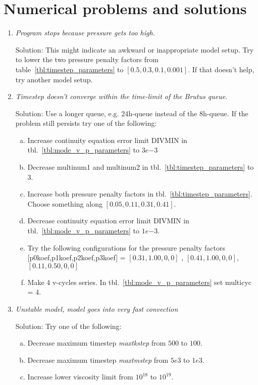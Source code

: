 
\section{Numerical problems and solutions}

\begin{enumerate}[-]
\item \textit{Program stops because pressure gets too high.}

Solution: This might indicate an awkward or inappropriate model setup. Try to lower the two pressure penalty factors from table~\ref{tbl:timestep_parameters} to $[0.5,0.3,0.1,0.001]$. If that doesn't help, try another model setup.
\item \textit{Timestep doesn't converge within the time-limit of the Brutus queue.}

Solution: Use a longer queue, e.g. 24h-queue instead of the 8h-queue. If the problem still persists try one of the following:
\begin{enumerate}[a)]
\item Increase continuity equation error limit DIVMIN in tbl.~\ref{tbl:mode_v_p_parameters} to $3e{-3}$
\item Decrease multinum1 and multinum2 in tbl.~\ref{tbl:timestep_parameters} to $3$.
\item Increase both pressure penalty factors in tbl.~\ref{tbl:timestep_parameters}. Choose something along $[0.05,0.11,0.31,0.41]$.
\item Decrease continuity equation error limit DIVMIN in tbl.~\ref{tbl:mode_v_p_parameters} to $1e{-3}$.
\item Try the following configurations for the pressure penalty factors [p0koef,p1koef,p2koef,p3koef] = $[0.31,1.00,0,0]$ , $[0.41,1.00,0,0]$, $[0.11,0.50,0,0]$
\item Make 4 v-cycles series. In tbl.~\ref{tbl:mode_v_p_parameters} set multicyc = $4$.
\end{enumerate}
\item \textit{Unstable model, model goes into very fast convection}

Solution: Try one of the following:
\begin{enumerate}[a)]
\item Decrease maximum timestep \textit{maxtkstep} from $500$ to $100$.
\item Decrease maximum timestep \textit{maxtmstep} from $5e3$ to $1e3$.
\item Increase lower viscosity limit from $10^{18}$ to $10^{19}$.
\end{enumerate}


\end{enumerate}
